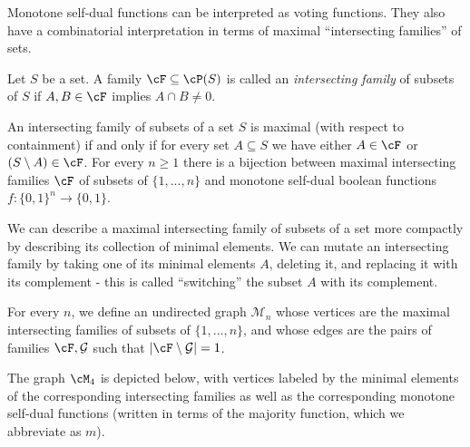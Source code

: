 Monotone self-dual functions can be interpreted as voting functions. They also have a combinatorial interpretation in terms of maximal ``intersecting families'' of sets.

\begin{defn} Let $S$ be a set. A family $\cF\subseteq \cP(S)$ is called an \emph{intersecting family} of subsets of $S$ if $A,B\in \cF$ implies $A\cap B\ne 0$.
\end{defn}

\begin{prop} An intersecting family of subsets of a set $S$ is maximal (with respect to containment) if and only if for every set $A\subseteq S$ we have either $A\in\cF$ or $(S\setminus A)\in\cF$. For every $n\ge 1$ there is a bijection between maximal intersecting families $\cF$ of subsets of $\{1,...,n\}$ and monotone self-dual boolean functions $f:\{0,1\}^n\rightarrow \{0,1\}$.
\end{prop}

We can describe a maximal intersecting family of subsets of a set more compactly by describing its collection of minimal elements. We can mutate an intersecting family by taking one of its minimal elements $A$, deleting it, and replacing it with its complement - this is called ``switching'' the subset $A$ with its complement.

\begin{defn} For every $n$, we define an undirected graph $\mathcal{M}_n$ whose vertices are the maximal intersecting families of subsets of $\{1,...,n\}$, and whose edges are the pairs of families $\cF, \mathcal{G}$ such that $|\cF \setminus \mathcal{G}| = 1$.
\end{defn}

The graph $\cM_4$ is depicted below, with vertices labeled by the minimal elements of the corresponding intersecting families as well as the corresponding monotone self-dual functions (written in terms of the majority function, which we abbreviate as $m$).

